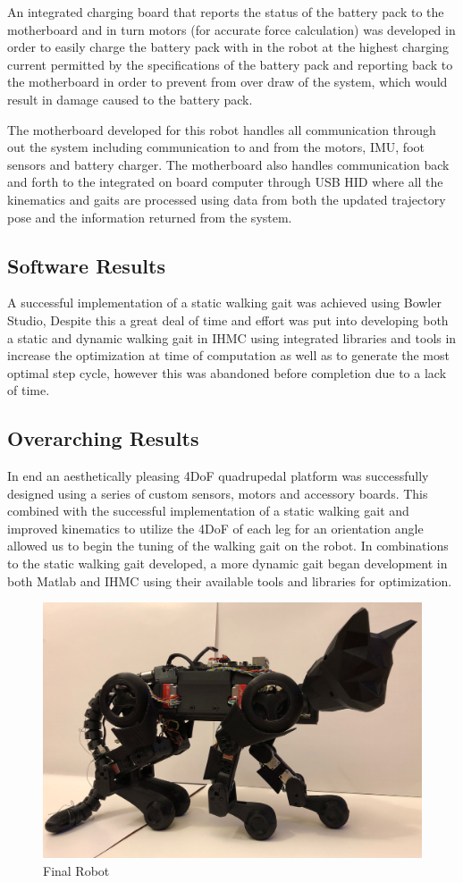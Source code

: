 An integrated charging board that reports the status of the battery pack to the motherboard and in turn motors (for accurate force calculation) was developed in order to easily charge the battery pack with in the robot at the highest charging current permitted by the specifications of the battery pack and reporting back to the motherboard in order to prevent from over draw of the system, which would result in damage caused to the battery pack. 

The motherboard developed for this robot handles all communication through out the system including communication to and from the motors, IMU, foot sensors and battery charger. The motherboard also handles communication back and forth to the integrated on board computer through USB HID where all the kinematics and gaits are processed using data from both the updated trajectory pose and the information returned from the system. 

\subsection{Software Results}
A successful implementation of a static walking gait was achieved using Bowler Studio, Despite this a great deal of time and effort was put into developing both a static and dynamic walking gait in IHMC using integrated libraries and tools in increase the optimization at time of computation as well as to generate the most optimal step cycle, however this was abandoned before completion due to a lack of time.
\subsection{Overarching Results}
In end an aesthetically pleasing 4DoF quadrupedal platform was successfully designed using a series of custom sensors, motors and accessory boards. This combined with the successful implementation of a static walking gait and improved kinematics to utilize the 4DoF of each leg for an orientation angle allowed us to begin the tuning of the walking gait on the robot. In combinations to the static walking gait developed, a more dynamic gait began development in both Matlab and IHMC using their available tools and libraries for optimization.
\begin{figure}[H]
            \centering
            \includegraphics[width=120mm]{figures/FinalRobot.jpg}
            \caption{Final Robot}
            \label{fig:FinalRobot}
\end{figure}

